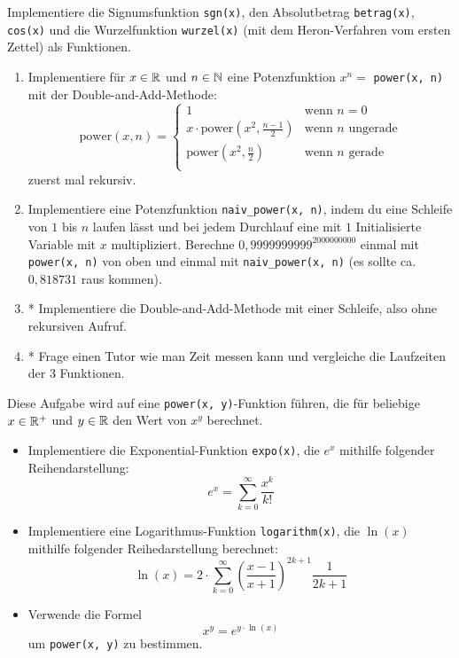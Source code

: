 \documentclass{uebungszettel}
\begin{document}
\newcommand{\ah}[2]{\ \\* \emph{(#1, #2)}\\}
\newcommand{\power}{\mathrm{power}}

\begin{aufg}
Implementiere die Signumsfunktion \verb|sgn(x)|, den Absolutbetrag \verb|betrag(x)|, \verb|cos(x)| und die Wurzelfunktion \verb|wurzel(x)| (mit dem Heron-Verfahren vom ersten Zettel) als Funktionen.
\end{aufg}


\begin{aufg}
\begin{enumerate}[leftmargin=*]
\item Implementiere für $x \in \mathbb{R}$ und $n \in \mathbb{N}$ eine Potenzfunktion $x^n=$ \verb|power(x, n)| mit der Double-and-Add-Methode: \[
	\power(x, n) = \left\{ \begin{array}{ll}
	1 & \text{wenn } n = 0 \\
	x \cdot \power\left(x^2, \frac{n-1}{2}\right) & \text{wenn } n \text{ ungerade} \\
	\power\left(x^2, \frac{n}{2}\right) & \text{wenn } n \text{ gerade} \\
	\end{array}
	\right.
\]
zuerst mal rekursiv. 
\item Implementiere eine Potenzfunktion \verb|naiv_power(x, n)|, indem du eine Schleife von $1$ bis $n$ laufen lässt und bei jedem Durchlauf eine mit $1$ Initialisierte Variable mit $x$ multipliziert. Berechne $0,9999999999^{2000000000}$ einmal mit \verb|power(x, n)| von oben und einmal mit \verb|naiv_power(x, n)| (es sollte ca. $0,818731$ raus kommen). 
\item* Implementiere die Double-and-Add-Methode mit einer Schleife, also ohne rekursiven Aufruf.
\item* Frage einen Tutor wie man Zeit messen kann und vergleiche die Laufzeiten der 3 Funktionen.
\end{enumerate}
\end{aufg}
\begin{aufg}
Diese Aufgabe wird auf eine \verb|power(x, y)|-Funktion führen, die für beliebige $x \in \mathbb{R}^+$ und $y \in \mathbb{R}$ den Wert von $x^y$ berechnet.
\begin{itemize}[leftmargin=*]
\item Implementiere die Exponential-Funktion \verb|expo(x)|, die $e^x$ mithilfe folgender Reihendarstellung: \[
e^x = \sum_{k=0}^\infty \frac{x^k}{k!} \]
\item Implementiere eine Logarithmus-Funktion \verb|logarithm(x)|, die $\ln(x)$ mithilfe folgender Reihedarstellung berechnet: \[
\ln(x) = 2\cdot \sum_{k = 0}^\infty \left(\frac{x-1}{x+1}\right)^{2k + 1} \frac{1}{2k + 1} \]
\item Verwende die Formel \[
x^y = e^{y \cdot \ln(x)} \] um \verb|power(x, y)| zu bestimmen.
\end{itemize}
\end{aufg}
\end{document}
